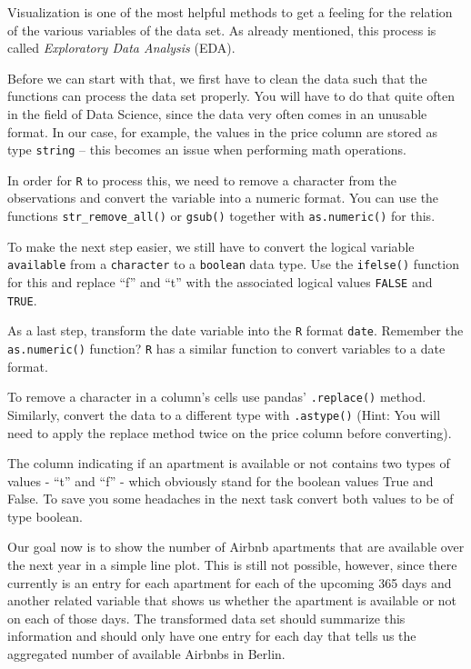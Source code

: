 \documentclass[
  11pt,
]{article}
\newenvironment{tips}[1]
  {
  \begin{itemize}
  \footnotesize
  \renewcommand{\labelitemi}{
    \raisebox{-.7\height}[0pt][0pt]{
      {\setkeys{Gin}{width=3em,keepaspectratio}
        \texttt{[image: images/\#1.png]}}
    }
  }
  \setlength{\fboxsep}{1em}
  \begin{rbox}
  \item
  }
  {
  \end{rbox}
  \end{itemize}
  }
\newenvironment{tipsp}[1]
  {
  \begin{itemize}
  \footnotesize
  \renewcommand{\labelitemi}{
    \raisebox{-.7\height}[0pt][0pt]{
      {\setkeys{Gin}{width=3em,keepaspectratio}
        \texttt{[image: images/\#1.png]}}
    }
  }
  \setlength{\fboxsep}{1em}
  \begin{pbox}
  \item
  }
  {
  \end{pbox}
  \end{itemize}
  }
\begin{document}
Visualization is one of the most helpful methods to get a feeling for the relation of the various variables of the data set. As already mentioned, this process is called \emph{Exploratory Data Analysis} (EDA).

Before we can start with that, we first have to clean the data such that the functions can process the data set properly. You will have to do that quite often in the field of Data Science, since the data very often comes in an unusable format. In our case, for example, the values in the price column are stored as type \texttt{string} -- this becomes an issue when performing math operations.

\begin{tips}r

In order for \texttt{R} to process this, we need to remove a character from the observations and convert the variable into a numeric format. You can use the functions \texttt{str\_remove\_all()} or \texttt{gsub()} together with \texttt{as.numeric()} for this.

To make the next step easier, we still have to convert the logical variable \texttt{available} from a \texttt{character} to a \texttt{boolean} data type. Use the \texttt{ifelse()} function for this
and replace ``f'' and ``t'' with the associated logical values \texttt{FALSE} and \texttt{TRUE}.

As a last step, transform the date variable into the \texttt{R} format \texttt{date}. Remember the \texttt{as.numeric()} function? \texttt{R} has a similar function to convert variables to a date format.

\end{tips}

\begin{tipsp}p

To remove a character in a column's cells use pandas' \texttt{.replace()} method. Similarly, convert the data to a different type with \texttt{.astype()} (Hint: You will need to apply the replace method twice on the price column before converting).

The column indicating if an apartment is available or not contains two types of values - ``t'' and ``f'' - which obviously stand for the boolean values True and False. To save you some headaches in the next task convert both values to be of type boolean.

\end{tipsp}

Our goal now is to show the number of Airbnb apartments that are available over the next year in a simple line plot. This is still not possible, however, since there currently is an entry for each apartment for each of the upcoming 365 days and another related variable that shows us whether the apartment is available or not on each of those days. The transformed data set should summarize this information and should only have one entry for each day that tells us the aggregated number of available Airbnbs in Berlin.
\end{document}
